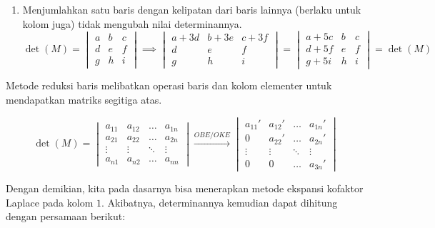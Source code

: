 \begin{enumerate}
            \item Menjumlahkan satu baris dengan kelipatan dari baris lainnya (berlaku untuk kolom juga) tidak mengubah nilai determinannya.
            \[\det(M) = 
            \begin{vmatrix}
                a & b & c \\    
                d & e & f \\
                g & h & i 
            \end{vmatrix} 
            \implies
            \begin{vmatrix}
                a + 3d & b + 3e & c + 3f \\    
                d & e & f \\
                g & h & i 
            \end{vmatrix} 
            = 
            \begin{vmatrix}
                a + 5c & b & c \\    
                d + 5f & e & f \\
                g + 5i & h & i 
            \end{vmatrix} 
            =
            \det(M)
            \]
        \end{enumerate}

        Metode reduksi baris melibatkan operasi baris dan kolom elementer untuk mendapatkan matriks segitiga atas.

        \[ 
            \det(M) = 
            \begin{vmatrix}
                a_{11} & a_{12} & \ldots & a_{1n} \\    
                a_{21} & a_{22} & \ldots & a_{2n} \\
                \vdots & \vdots & \ddots & \vdots \\
                a_{n1} & a_{n2} & \ldots & a_{nn} 
            \end{vmatrix} 
            \stackrel{OBE/OKE}{\longrightarrow}
            \begin{vmatrix}
                a_{11}' & a_{12}'   & \ldots & a_{1n}'   \\    
                0       & a_{22}'   & \ldots & a_{2n}'   \\
                \vdots  & \vdots    & \ddots & \vdots    \\
                0       & 0         & \ldots & a_{3n}' 
            \end{vmatrix} 
        \]

        Dengan demikian, kita pada dasarnya bisa menerapkan metode ekspansi kofaktor Laplace pada kolom $1$. Akibatnya, determinannya kemudian dapat dihitung dengan persamaan berikut:

